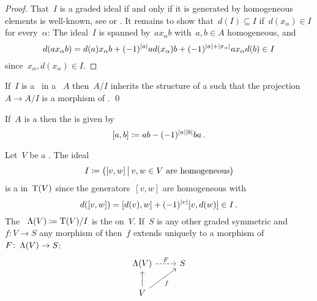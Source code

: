\documentclass[a4paper,10pt,headings=standardclasses]{scrartcl}
\begin{document}
\begin{proof}
  That~$I$ is a graded ideal if and only if it is generated by homogeneous elements is  well-known, see \cite[IX, 2.5]{lang} or \cite[II.{\S}11.3]{bourbaki}.
  It remains to show that~$d(I) \subseteq I$ if~$d(x_\alpha) \in I$ for every~$\alpha$:
  The ideal~$I$ is spanned by~$a x_\alpha b$ with~$a, b \in A$ homogeneous, and
  \[
    d(a x_\alpha b)
    =
      d(a) x_\alpha b
    + (-1)^{\lvert a\rvert} a d(x_\alpha) b
    + (-1)^{\lvert a\rvert + \lvert x_\alpha\rvert} a x_\alpha d(b)
    \in
    I
  \]
  since~$x_\alpha, d(x_\alpha) \in I$.
\end{proof}

\begin{lemma}
  If~$I$ is a~{\dgi} in a {\dga}~$A$ then~$A/I$ inherits the structure of a {\dga} such that the projection~$A \to A/I$ is a morphism of {\dgas}.
  \qed
\end{lemma}

\begin{definition}
  If~$A$ is a {\dga} then the  is given by
  \[
    [a,b]
    \coloneqq
    ab - (-1)^{\lvert a\rvert\lvert b\rvert} ba \,.
  \]
\end{definition}

\begin{example}
  \label{dg symmetric algebra}
  Let~$V$ be a {\dgv}.
  The ideal
  \[
    I
    \defined
    \bigl(
      [v,w]
    \suchthat[\big]
      \text{$v,w \in V$ are homogeneous}
    \bigr)
  \]
  is a {\dgi} in~$\operatorname{T}(V)$ since the generators~$[v,w]$ are homogeneous with
  \[
    d([v,w])
    =
    [d(v), w] + (-1)^{\lvert v\rvert} [v, d(w)]
    \in
    I \,.
  \]
  The {\dga}~$\operatorname{\Lambda}(V) \coloneqq \operatorname{T}(V)/I$ is the  on~$V$.
  If~$S$ is any other graded symmetric {\dga} and~$f \colon V \to S$ any morphism of {\dgv} then~$f$ extends uniquely to a morphism of~{\dgas}~$F \colon \operatorname{\Lambda}(V) \to S$:
  \[
    \begin{tikzcd}
      \dgSymm(V)
      \arrow[dashed]{r}[above]{F}
      &
      S
      \\
      V
      \arrow{u}
      \arrow{ur}[below right]{f}
      &
      {}
    \end{tikzcd}
  \]

\end{example}
\end{document}
